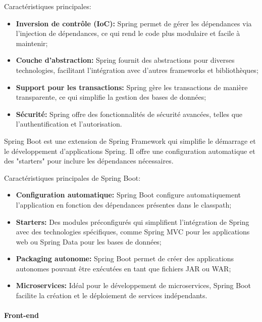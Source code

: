 \documentclass[12pt]{report}
\makeatletter
\renewcommand\subparagraph{\@startsection{subparagraph}{5}{\z@}{3.25ex \@plus1ex \@minus.2ex}{1ex \@plus.2ex}{\normalfont\normalsize\bfseries}} \renewcommand\thesubparagraph{$-$} \makeatother
\makeatother
\begin{document}
				Caractéristiques principales:
				
				\begin{itemize}
					\item \textbf{Inversion de contrôle (IoC):} Spring permet de gérer les dépendances via l'injection de dépendances, ce qui rend le code plus modulaire et facile à maintenir;
					\item \textbf{Couche d'abstraction:} Spring fournit des abstractions pour diverses technologies, facilitant l'intégration avec d'autres frameworks et bibliothèques;
					\item \textbf{Support pour les transactions:} Spring gère les transactions de manière transparente, ce qui simplifie la gestion des bases de données;
					\item \textbf{Sécurité:} Spring offre des fonctionnalités de sécurité avancées, telles que l'authentification et l'autorisation.
				\end{itemize}

				\subparagraph{Spring Boot}

				Spring Boot est une extension de Spring Framework qui simplifie le démarrage et le développement d'applications Spring. Il offre une configuration automatique et des "starters" pour inclure les dépendances nécessaires.

				Caractéristiques principales de Spring Boot:
				
				\begin{itemize}
					\item \textbf{Configuration automatique:} Spring Boot configure automatiquement l'application en fonction des dépendances présentes dans le classpath;
					\item \textbf{Starters:} Des modules préconfigurés qui simplifient l'intégration de Spring avec des technologies spécifiques, comme Spring MVC pour les applications web ou Spring Data pour les bases de données;
					\item \textbf{Packaging autonome:} Spring Boot permet de créer des applications autonomes pouvant être exécutées en tant que fichiers JAR ou WAR;
					\item \textbf{Microservices:} Idéal pour le développement de microservices, Spring Boot facilite la création et le déploiement de services indépendants.
				\end{itemize}

				\paragraph{Front-end}
\end{document}
